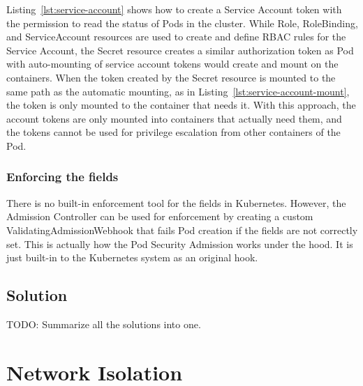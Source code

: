 \documentclass[english, 12pt, a4paper, sci, utf8, a-2b, online]{aaltothesis}
\begin{document}
Listing~\ref{lst:service-account} shows how to create a Service Account token with the permission to read the status of Pods in the cluster.
While Role, RoleBinding, and ServiceAccount resources are used to create and define RBAC rules for the Service Account, the Secret resource creates a similar authorization token as Pod with auto-mounting of service account tokens would create and mount on the containers.
When the token created by the Secret resource is mounted to the same path as the automatic mounting, as in Listing~\ref{lst:service-account-mount}, the token is only mounted to the container that needs it.
With this approach, the account tokens are only mounted into containers that actually need them, and the tokens cannot be used for privilege escalation from other containers of the Pod.



\subsubsection{Enforcing the fields}

There is no built-in enforcement tool for the fields in Kubernetes.
However, the Admission Controller can be used for enforcement by creating a custom ValidatingAdmissionWebhook that fails Pod creation if the fields are not correctly set.
This is actually how the Pod Security Admission works under the hood.
It is just built-in to the Kubernetes system as an original hook.


\subsection{Solution}

TODO: Summarize all the solutions into one.

\clearpage

\section{Network Isolation} \label{sec:network-solution}
\end{document}
